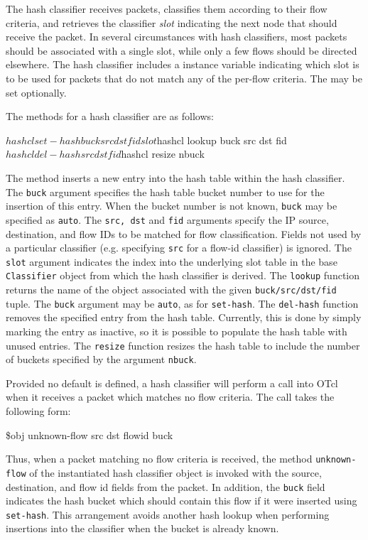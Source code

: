 The hash classifier receives packets, classifies them according
to their flow criteria, and retrieves the classifier {\em slot}
indicating the next node that should receive the packet.
In several circumstances with hash classifiers, most packets should
be associated with a single slot, while only a few flows should
be directed elsewhere. 
The hash classifier includes a  instance variable
indicating which slot is to be used for packets that do not match
any of the per-flow criteria.
The  may be set optionally.

The methods for a hash classifier are as follows:
\begin{program}
        $hashcl set-hash buck src dst fid slot
        $hashcl lookup buck src dst fid
        $hashcl del-hash src dst fid
        $hashcl resize nbuck
\end{program}

The  method inserts a new entry into the hash
table within the hash classifier.
The {\tt buck} argument specifies the hash table bucket number
to use for the insertion of this entry.
When the bucket number is not known, {\tt buck} may be specified
as {\tt auto}. 
The {\tt src, dst} and {\tt fid} arguments specify the IP source,
destination, and flow IDs to be matched for flow classification.
Fields not used by a particular classifier (e.g. specifying {\tt src}
for a flow-id classifier) is ignored.
The {\tt slot} argument indicates the index into the underlying
slot table in the base {\tt Classifier} object from which
the hash classifier is derived.
The {\tt lookup} function returns the name of the object
associated with the given {\tt buck/src/dst/fid} tuple.
The {\tt buck} argument may be {\tt auto}, as for {\tt set-hash}.
The {\tt del-hash} function removes the specified entry from
the hash table.
Currently, this is done by simply marking the entry as inactive,
so it is possible to populate the hash table with unused entries.
The {\tt resize} function resizes the hash table to include
the number of buckets specified by the argument {\tt nbuck}.

Provided no default is defined, a hash classifier will
perform a call into OTcl when it
receives a packet which matches no flow criteria.
The call takes the following form:
\begin{program}
        \$obj unknown-flow src dst flowid buck
\end{program} 
Thus, when a packet matching no flow criteria is received,
the method {\tt unknown-flow} of the instantiated hash classifier
object is invoked with the source, destination, and flow id
fields from the packet.
In addition, the {\tt buck} field indicates the hash bucket
which should contain this flow if it were inserted using
{\tt set-hash}.  This arrangement avoids another hash
lookup when performing insertions into the classifier when the
bucket is already known.

